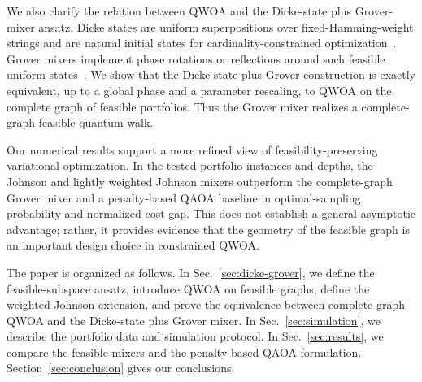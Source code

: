 We also clarify the relation between QWOA and the Dicke-state plus
Grover-mixer ansatz. Dicke states are uniform superpositions over
fixed-Hamming-weight strings and are natural initial states for
cardinality-constrained optimization~\cite{Bartschi2019,Cook2019}. Grover
mixers implement phase rotations or reflections around such feasible uniform
states~\cite{Bartschi2020,Bridi2024}. We show that the Dicke-state plus Grover
construction is exactly equivalent, up to a global phase and a parameter
rescaling, to QWOA on the complete graph of feasible portfolios. Thus the
Grover mixer realizes a complete-graph feasible quantum walk.

Our numerical results support a more refined view of feasibility-preserving
variational optimization. In the tested portfolio instances and depths, the
Johnson and lightly weighted Johnson mixers outperform the complete-graph
Grover mixer and a penalty-based QAOA baseline in optimal-sampling probability
and normalized cost gap. This does not establish a general asymptotic
advantage; rather, it provides evidence that the geometry of the feasible graph
is an important design choice in constrained QWOA.

The paper is organized as follows. In Sec.~\ref{sec:dicke-grover}, we define
the feasible-subspace ansatz, introduce QWOA on feasible graphs, define the
weighted Johnson extension, and prove the equivalence between complete-graph
QWOA and the Dicke-state plus Grover mixer. In Sec.~\ref{sec:simulation}, we
describe the portfolio data and simulation protocol. In Sec.~\ref{sec:results},
we compare the feasible mixers and the penalty-based QAOA formulation.
Section~\ref{sec:conclusion} gives our conclusions.
